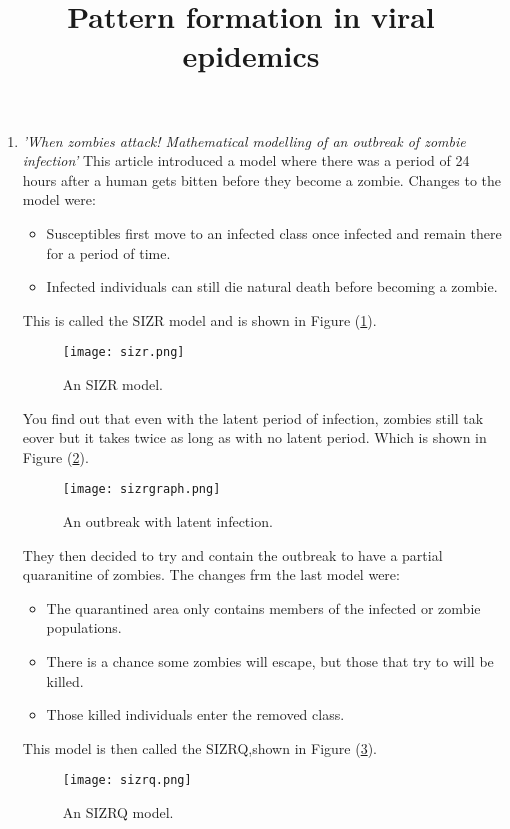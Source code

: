 \documentclass{mm2}
\title{Pattern formation in viral epidemics}
\begin{document}
\begin{enumerate}
	\item\textit{'When zombies attack! Mathematical modelling of an outbreak of zombie infection'} \newline
	This article introduced a model where there was a period of 24 hours after a human gets bitten before they become a zombie. Changes to the model were: \newline
	\begin{itemize}
		\item Susceptibles first move to an infected class once infected and remain there for a period of time.
		\item Infected individuals can still die natural death before becoming a zombie.
	\end{itemize}
	This is called the SIZR model and is shown in Figure (\ref{sizr}).\newline
	\begin{figure}[ht]
		\centering
		\texttt{[image: sizr.png]}
		\caption{An SIZR model.}
		\label{sizr}
	\end{figure}\newline
	You find out that even with the latent period of infection, zombies still tak eover but it takes twice as long as with no latent period. Which is shown in Figure (\ref{sizrgraph}).\newline
	\begin{figure}[ht]
		\centering
		\texttt{[image: sizrgraph.png]}
		\caption{An outbreak with latent infection.}
			\label{sizrgraph}
	\end{figure}\newpage
	They then decided to try and contain the outbreak to have a partial quaranitine of zombies. The changes frm the last model were:
	\begin{itemize}
		\item The quarantined area only contains members of the infected or zombie populations.
		\item There is a chance some zombies will escape, but those that try to will be killed.
		\item Those killed individuals enter the removed class.
	\end{itemize}
	This model is then called the SIZRQ,shown in Figure (\ref{sizrq}).\newline
	\begin{figure}[ht]
		\centering
		\texttt{[image: sizrq.png]}
		\caption{An SIZRQ model.}
		\label{sizrq}
	\end{figure}\newline

\end{enumerate}
\end{document}
